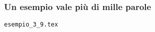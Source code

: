 \documentclass[svgnames,%
	ucs,%
	pdftex]{guitbeamer}
\begin{document}
\begin{frame}
  \frametitle{Un esempio vale pi\`u di mille parole}
	\begin{center}
		\alert{\texttt{esempio\_3\_9.tex}}
	\end{center}
\end{frame}
\end{document}
